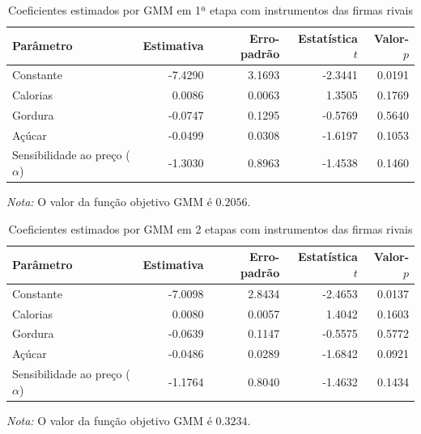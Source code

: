 
\begingroup
\begin{table}[H]
\centering
\caption{Coeficientes estimados por GMM em 1ª etapa com instrumentos das firmas rivais}
\label{tab:coef-gmm1-firmas-rivais}
\small
\begin{tabular}{lrrrr}
\toprule
Parâmetro & Estimativa & Erro-padrão & Estatística $t$ & Valor-$p$ \\
\midrule
Constante & -7.4290 & 3.1693 & -2.3441 & 0.0191 \\
Calorias & 0.0086 & 0.0063 & 1.3505 & 0.1769 \\
Gordura & -0.0747 & 0.1295 & -0.5769 & 0.5640 \\
Açúcar & -0.0499 & 0.0308 & -1.6197 & 0.1053 \\
Sensibilidade ao preço ($\alpha$) & -1.3030 & 0.8963 & -1.4538 & 0.1460 \\
\bottomrule
\end{tabular}

\vspace{0.3em}
\footnotesize
\textit{Nota:} O valor da função objetivo GMM é $0.2056$.
\end{table}
\endgroup


\begingroup
\begin{table}[H]
\centering
\caption{Coeficientes estimados por GMM em 2 etapas com instrumentos das firmas rivais}
\label{tab:coef-gmm2-firmas-rivais}
\small
\begin{tabular}{lrrrr}
\toprule
Parâmetro & Estimativa & Erro-padrão & Estatística $t$ & Valor-$p$ \\
\midrule
Constante & -7.0098 & 2.8434 & -2.4653 & 0.0137 \\
Calorias & 0.0080 & 0.0057 & 1.4042 & 0.1603 \\
Gordura & -0.0639 & 0.1147 & -0.5575 & 0.5772 \\
Açúcar & -0.0486 & 0.0289 & -1.6842 & 0.0921 \\
Sensibilidade ao preço ($\alpha$) & -1.1764 & 0.8040 & -1.4632 & 0.1434 \\
\bottomrule
\end{tabular}

\vspace{0.3em}
\footnotesize
\textit{Nota:} O valor da função objetivo GMM é $0.3234$.
\end{table}
\endgroup

